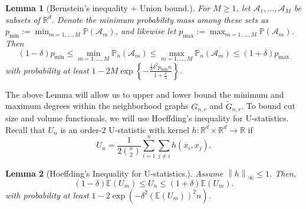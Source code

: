 \documentclass[11pt,twoside]{article}
\newtheorem{lemma}{Lemma}
\newcommand{\Reals}{\mathbb{R}}
\newcommand{\Rd}{\Reals^d}
\newcommand{\norm}[1]{\left\lVert#1\right\rVert}
\newcommand{\1}{\mathbf{1}}
\newcommand{\Pbb}{\mathbb{P}}
\begin{document}
\begin{lemma}[Bernstein's inequality + Union bound.]
	\label{lem:bernstein_union}
	For $M \geq 1$, let $\mathcal{A}_1,\ldots,\mathcal{A}_M$ be subsets of $\Reals^d$. Denote the minimum probability mass among these sets as $p_{\min} := \min_{m = 1,\ldots,M} \Pbb(\mathcal{A}_m)$, and likewise let $p_{\max} := \max_{m = 1,\ldots,M} \Pbb(\mathcal{A}_m)$. Then
	\begin{equation*}
	(1 - \delta)p_{\min} \leq \min_{m = 1,\ldots,M} \Pbb_n(\mathcal{A}_m) \leq \max_{m = 1,\ldots,M} \Pbb_n(\mathcal{A}_m) \leq (1 + \delta)p_{\max}
	\end{equation*}
	with probability at least $1 - 2 M \exp\left\{-\frac{\frac{1}{3}\delta^2p_{\min}n}{1 + \frac{\delta}{3}}\right\}$.  
\end{lemma}
The above Lemma will allow us to upper and lower bound the minimum and maximum degrees within the neighborhood graphs $G_{n,r}$ and $\widetilde{G}_{n,r}$. To bound cut size and volume functionals, we will use Hoeffding's inequality for U-statistics. Recall that $U_n$ is an order-2 U-statistic with kernel $h: \Rd \times \Rd \to \Reals$ if 
\begin{equation*}
U_n = \frac{1}{2{n \choose 2}}\sum_{i = 1}^{n} \sum_{j \neq i} h(x_i,x_j).
\end{equation*}
\begin{lemma}[Hoeffding's Inequality for U-statistics.]
	\label{lem:hoeffding}
	Assume $\norm{h}_{\infty} \leq 1$. Then,
	\begin{equation*}
	(1 - \delta) \mathbb{E}(U_m) \leq U_n \leq (1 + \delta) \mathbb{E}(U_m).
	\end{equation*}
	with probability at least $1 - 2 \exp\left(-\delta^2 (\mathbb{E}(U_m))^2 n\right)$.
\end{lemma}
\end{document}
